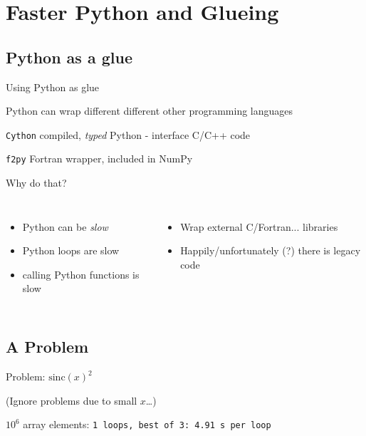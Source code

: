 \section{Faster Python and Glueing}

\subsection{Python as a glue}

\begin{frame}{Using Python as glue}

Python can wrap different different other programming languages\\[1ex]

\begin{exbox}{{\texttt{Cython}}}
    compiled, \emph{typed} Python - interface C/C++ code
\end{exbox}

\begin{exbox}{{\texttt{f2py}}}
    Fortran wrapper, included in NumPy
\end{exbox}

Why do that?
\begin{columns}

\begin{itemize}
    \item Python can be \emph{slow}
    \item Python loops are slow
    \item calling Python functions is slow
\end{itemize}

\begin{itemize}
    \item Wrap external C/Fortran... libraries
    \item Happily/unfortunately (?) there is legacy code
\end{itemize}

\end{columns}

\end{frame}


\subsection{A Problem}

\begin{frame}[fragile]{Problem: $\mathrm{sinc}(x)^{2}$}



{\small (Ignore problems due to small $x$\dots)}

\pause
$10^{6}$ array elements: {\texttt{1 loops, best of 3: 4.91 s per loop}}
\end{frame}


